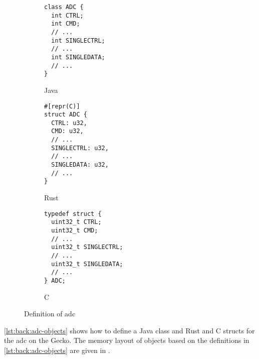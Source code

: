 \begin{figure}[H]
  \centering
  \begin{subfigure}{0.31\textwidth}
    \begin{verbatim}
class ADC {
  int CTRL;
  int CMD;
  // ...
  int SINGLECTRL;
  // ...
  int SINGLEDATA;
  // ...
}
    \end{verbatim}
    \caption{Java}
    \label{fig:back:adc-objects:java}
  \end{subfigure}
  \hfill
  \begin{subfigure}{0.31\textwidth}
    \begin{verbatim}
#[repr(C)]
struct ADC {
  CTRL: u32,
  CMD: u32,
  // ...
  SINGLECTRL: u32,
  // ...
  SINGLEDATA: u32,
  // ...
}
    \end{verbatim}
    \caption{Rust}
    \label{fig:back:adc-objects:rust}
  \end{subfigure}
  \hfill
  \begin{subfigure}{0.31\textwidth}
    \begin{verbatim}
typedef struct {
  uint32_t CTRL;
  uint32_t CMD;
  // ...
  uint32_t SINGLECTRL;
  // ...
  uint32_t SINGLEDATA;
  // ...
} ADC;
    \end{verbatim}
    \caption{C}
    \label{fig:back:adc-objects:c}
  \end{subfigure}

  \caption{Definition of \gls{adc}}
  \label{lst:back:adc-objects}
\end{figure}

\autoref{lst:back:adc-objects} shows how to define a Java class and Rust and C structs for the \gls{adc} on the Gecko.
The memory layout of objects based on the definitions in \autoref{lst:back:adc-objects} are given in \label{fig:back:memlayout}.

